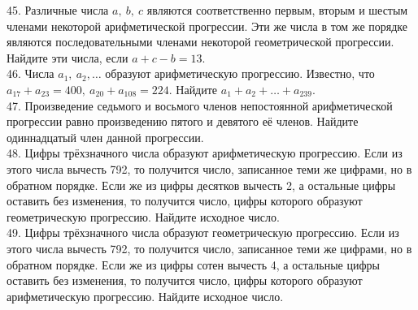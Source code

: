 \documentclass[12pt]{article}
\begin{document}
45. Различные числа $a,\ b,\ c$ являются соответственно первым, вторым и шестым членами некоторой арифметической прогрессии. Эти же числа в том же порядке являются последовательными членами некоторой геометрической прогрессии. Найдите эти числа, если $a+c-b=13.$\\
46. Числа $a_1,\ a_2,\ldots$ образуют арифметическую прогрессию. Известно, что $a_{17}+a_{23}=400,\ a_{20}+a_{108}=224.$ Найдите $a_{1}+a_2+\ldots+a_{239}.$\\
47. Произведение седьмого и восьмого членов непостоянной арифметической прогрессии равно произведению пятого и девятого её членов. Найдите одиннадцатый член данной прогрессии.\\
48. Цифры трёхзначного числа образуют арифметическую прогрессию. Если из этого числа вычесть 792, то получится число, записанное теми же цифрами, но в обратном порядке. Если же из цифры десятков вычесть 2, а остальные цифры оставить без изменения, то получится число, цифры которого образуют геометрическую прогрессию. Найдите исходное число.\\
49. Цифры трёхзначного числа образуют геометрическую прогрессию. Если из этого числа вычесть 792, то получится число, записанное теми же цифрами, но в обратном порядке. Если же из цифры сотен вычесть 4, а остальные цифры оставить без изменения, то получится число, цифры которого образуют арифметическую прогрессию. Найдите исходное число.
\newpage
\end{document}
